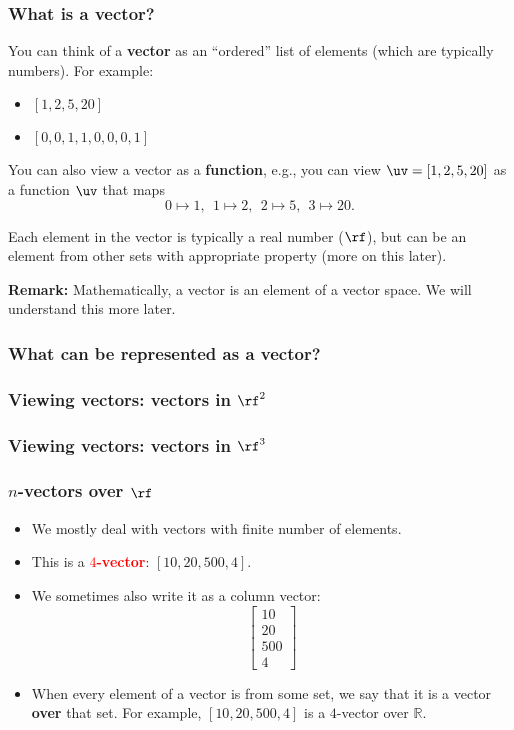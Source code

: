 

\begin{frame}\frametitle{What is a vector?}
  You can think of a {\bf vector} as an ``ordered'' list of elements (which are
  typically numbers).  For example:
  \begin{itemize}
  \item $[1,2,5,20]$
  \item $[0,0,1,1,0,0,0,1]$
  \end{itemize}

  \pause

  You can also view a vector as a {\bf function}, e.g., you can view
  $\uv = [1,2,5,20]$ as a function $\uv$ that maps
  \[
  0 \mapsto 1, \ \
  1 \mapsto 2, \ \
  2 \mapsto 5, \ \
  3 \mapsto 20.
  \]

  \pause
  
  Each element in the vector is typically a real number ($\rf$), but
  can be an element from other sets with appropriate property (more on
  this later).

  \pause

  { \tiny {\bf Remark:} Mathematically, a vector is an element of a
    vector space.  We will understand this more later.}
\end{frame}

\begin{frame}
  \frametitle{What can be represented as a vector?}
\end{frame}

\begin{frame}
  \frametitle{Viewing vectors: vectors in $\rf^2$}
\end{frame}

\begin{frame}
  \frametitle{Viewing vectors: vectors in $\rf^3$}
\end{frame}

\begin{frame}
  \frametitle{$n$-vectors over $\rf$}

  \begin{itemize}
  \item We mostly deal with vectors with finite number of elements.
  \item This is a \textcolor{red}{\bf $4$-vector}: $[10,20,500,4]$.
    \pause
  \item We sometimes also write it as a column vector:
    \[
    \begin{bmatrix}
      10 \\ 20 \\ 500 \\ 4
    \end{bmatrix}
    \]
    \pause
  \item When every element of a vector is from some set, we say that
    it is a vector {\bf over} that set.  For example, $[10,20,500,4]$
    is a $4$-vector over ${\mathbb R}$.
  \end{itemize}
\end{frame}

